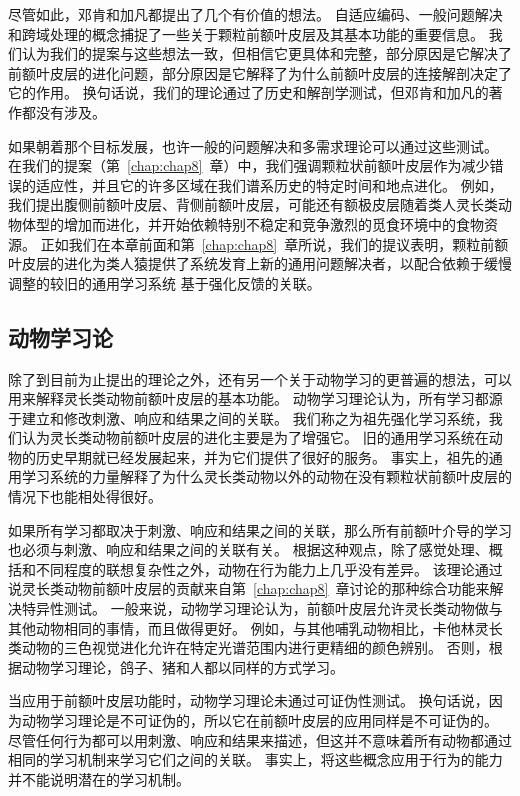 尽管如此，邓肯和加凡都提出了几个有价值的想法。
自适应编码、一般问题解决和跨域处理的概念捕捉了一些关于颗粒前额叶皮层及其基本功能的重要信息。
我们认为我们的提案与这些想法一致，但相信它更具体和完整，部分原因是它解决了前额叶皮层的进化问题，部分原因是它解释了为什么前额叶皮层的连接解剖决定了它的作用。
换句话说，我们的理论通过了历史和解剖学测试，但邓肯和加凡的著作都没有涉及。
\par


如果朝着那个目标发展，也许一般的问题解决和多需求理论可以通过这些测试。
在我们的提案（第~\ref{chap:chap8}~章）中，我们强调颗粒状前额叶皮层作为减少错误的适应性，并且它的许多区域在我们谱系历史的特定时间和地点进化。
例如，我们提出腹侧前额叶皮层、背侧前额叶皮层，可能还有额极皮层随着类人灵长类动物体型的增加而进化，并开始依赖特别不稳定和竞争激烈的觅食环境中的食物资源。
正如我们在本章前面和第~\ref{chap:chap8}~章所说，我们的提议表明，颗粒前额叶皮层的进化为类人猿提供了系统发育上新的通用问题解决者，以配合依赖于缓慢调整的较旧的通用学习系统 基于强化反馈的关联。



\subsection{动物学习论}
除了到目前为止提出的理论之外，还有另一个关于动物学习的更普遍的想法，可以用来解释灵长类动物前额叶皮层的基本功能。
动物学习理论认为，所有学习都源于建立和修改刺激、响应和结果之间的关联。
我们称之为祖先强化学习系统，我们认为灵长类动物前额叶皮层的进化主要是为了增强它。
旧的通用学习系统在动物的历史早期就已经发展起来，并为它们提供了很好的服务。
事实上，祖先的通用学习系统的力量解释了为什么灵长类动物以外的动物在没有颗粒状前额叶皮层的情况下也能相处得很好。
\par


如果所有学习都取决于刺激、响应和结果之间的关联，那么所有前额叶介导的学习也必须与刺激、响应和结果之间的关联有关。
根据这种观点，除了感觉处理、概括和不同程度的联想复杂性之外，动物在行为能力上几乎没有差异。
该理论通过说灵长类动物前额叶皮层的贡献来自第~\ref{chap:chap8}~章讨论的那种综合功能来解决特异性测试。
一般来说，动物学习理论认为，前额叶皮层允许灵长类动物做与其他动物相同的事情，而且做得更好。
例如，与其他哺乳动物相比，卡他林灵长类动物的三色视觉进化允许在特定光谱范围内进行更精细的颜色辨别。
否则，根据动物学习理论，鸽子、猪和人都以同样的方式学习。
\par


当应用于前额叶皮层功能时，动物学习理论未通过可证伪性测试。
换句话说，因为动物学习理论是不可证伪的，所以它在前额叶皮层的应用同样是不可证伪的。
尽管任何行为都可以用刺激、响应和结果来描述，但这并不意味着所有动物都通过相同的学习机制来学习它们之间的关联。
事实上，将这些概念应用于行为的能力并不能说明潜在的学习机制。
\par


